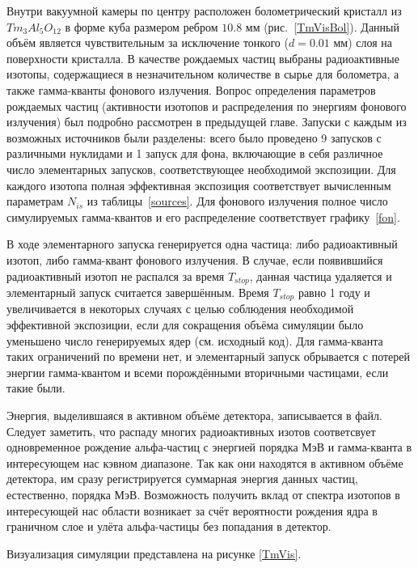\documentclass[a4paper,article,14pt]{extarticle}
\begin{document}
Внутри вакуумной камеры по центру расположен болометрический кристалл из $Tm_3Al_5O_{12}$ в форме куба размером ребром $ 10.8 \text{ мм}$ (рис.~\ref{TmVisBol}).
Данный объём является чувствительным за исключение тонкого ($d = 0.01 \text{ мм}$) слоя на поверхности кристалла.
В качестве рождаемых частиц выбраны радиоактивные изотопы, содержащиеся в незначительном количестве в сырье для болометра, а также гамма-кванты фонового излучения. Вопрос определения параметров рождаемых частиц (активности изотопов и распределения по энергиям фонового излучения) был подробно рассмотрен в предыдущей главе.
Запуски с каждым из возможных источников были разделены: всего было проведено 9 запусков с различными нуклидами и 1 запуск для фона, включающие в себя различное число элементарных запусков, соответствующее необходимой экспозиции.
Для каждого изотопа полная эффективная экспозиция соответствует вычисленным параметрам $N_{is}$ из таблицы~\ref{sources}.
Для фонового излучения полное число симулируемых гамма-квантов и его распределение соответствует графику~\ref{fon}.

В ходе элементарного запуска генерируется одна частица: либо радиоактивный изотоп, либо гамма-квант фонового излучения. В случае, если появившийся радиоактивный изотоп не распался за время $T_{stop}$, данная частица удаляется и элементарный запуск считается завершённым. Время $T_{stop}$ равно 1 году и увеличивается в некоторых случаях с целью соблюдения необходимой эффективной экспозиции, если  для сокращения объёма симуляции было уменьшено число генерируемых ядер (см. исходный код). Для гамма-кванта таких ограничений по времени нет, и элементарный запуск обрывается с потерей энергии гамма-квантом и всеми порождёнными вторичными частицами, если такие были.

Энергия, выделившаяся в активном объёме детектора, записывается в файл. Следует заметить, что распаду многих радиоактивных изотов соответсвует одновременное рождение альфа-частиц с энергией порядка МэВ и гамма-кванта в интересующем нас кэвном диапазоне. Так как они находятся в активном объёме детектора, им сразу регистрируется суммарная энергия данных частиц, естественно, порядка МэВ. Возможность получить вклад от спектра изотопов в интересующей нас области возникает за счёт вероятности рождения ядра в граничном слое и улёта альфа-частицы без попадания в детектор.

Визуализация симуляции представлена на рисунке \ref{TmVis}.
\end{document}

